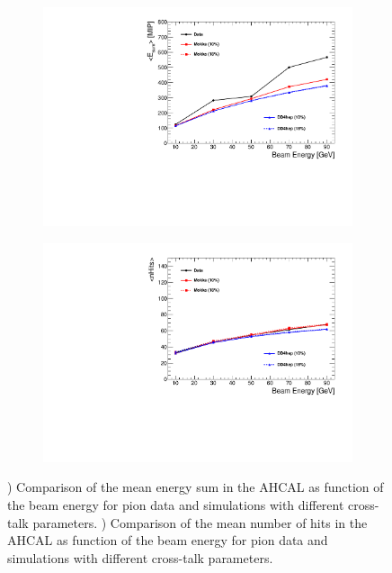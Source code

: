 \begin{figure}[htbp!]
  \centering
  \begin{subfigure}[t]{0.49\textwidth}
    \includegraphics[width=1.\linewidth]{../Thesis_Plots/Timing/Pions/Plots/EsumPions_BeamEnergy.pdf}
    \caption{} \label{fig:EsumMeanPion}
  \end{subfigure}
  \hfill
  \begin{subfigure}[t]{0.49\textwidth}
    \includegraphics[width=1.\linewidth]{../Thesis_Plots/Timing/Pions/Plots/nHitsPions_BeamEnergy.pdf}
    \caption{} \label{fig:nHitsMeanPion}
  \end{subfigure}
  \caption{) Comparison of the mean energy sum in the AHCAL as function of the beam energy for pion data and simulations with different cross-talk parameters. ) Comparison of the mean number of hits in the AHCAL as function of the beam energy for pion data and simulations with different cross-talk parameters.}
  \label{fig:piVal}
\end{figure}

